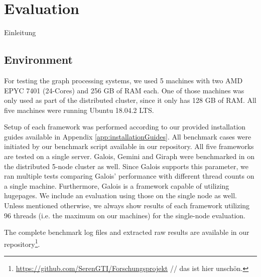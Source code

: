 
\section{Evaluation}
Einleitung

\subsection{Environment}
For testing the graph processing systems, we used 5 machines with two AMD EPYC 7401 (24-Cores) and 256 GB of RAM each. One of those machines was only used as part of the distributed cluster, since it only has 128 GB of RAM.
All five machines were running Ubuntu 18.04.2 LTS.

Setup of each framework was performed according to our provided installation guides available in Appendix \ref{app:installationGuides}.
All benchmark cases were initiated by our benchmark script available in our repository. 
All five frameworks are tested on a single server. 
Galois, Gemini and Giraph were benchmarked in on the distributed 5-node cluster as well.
Since Galois supports this parameter, we ran multiple tests comparing Galois' performance with different thread counts on a single machine.
Furthermore, Galois is a framework capable of utilizing hugepages. We include an evaluation using those on the single node as well.
Unless mentioned otherwise, we always show results of each framework utilizing 96 threads (i.e. the maximum on our machines) for the single-node evaluation.

The complete benchmark log files and extracted raw results are available in our repository\footnote{\url{https://github.com/SerenGTI/Forschungsprojekt} // das ist hier unschön.}.


